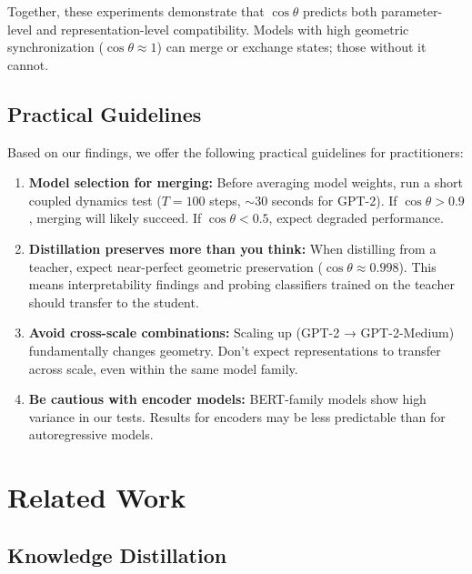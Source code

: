 \documentclass[10pt]{article} %
\theoremstyle{plain}
\theoremstyle{definition}
\theoremstyle{remark}
\begin{document}
Together, these experiments demonstrate that $\cos \theta$ predicts both parameter-level and representation-level compatibility. Models with high geometric synchronization ($\cos \theta \approx 1$) can merge or exchange states; those without it cannot.

\subsection{Practical Guidelines}

Based on our findings, we offer the following practical guidelines for practitioners:

\begin{enumerate}
    \item \textbf{Model selection for merging:} Before averaging model weights, run a short coupled dynamics test ($T=100$ steps, $\sim$30 seconds for GPT-2). If $\cos \theta > 0.9$, merging will likely succeed. If $\cos \theta < 0.5$, expect degraded performance.
    
    \item \textbf{Distillation preserves more than you think:} When distilling from a teacher, expect near-perfect geometric preservation ($\cos \theta \approx 0.998$). This means interpretability findings and probing classifiers trained on the teacher should transfer to the student.
    
    \item \textbf{Avoid cross-scale combinations:} Scaling up (GPT-2 → GPT-2-Medium) fundamentally changes geometry. Don't expect representations to transfer across scale, even within the same model family.
    
    \item \textbf{Be cautious with encoder models:} BERT-family models show high variance in our tests. Results for encoders may be less predictable than for autoregressive models.
\end{enumerate}

\section{Related Work}

\subsection{Knowledge Distillation}
\end{document}
